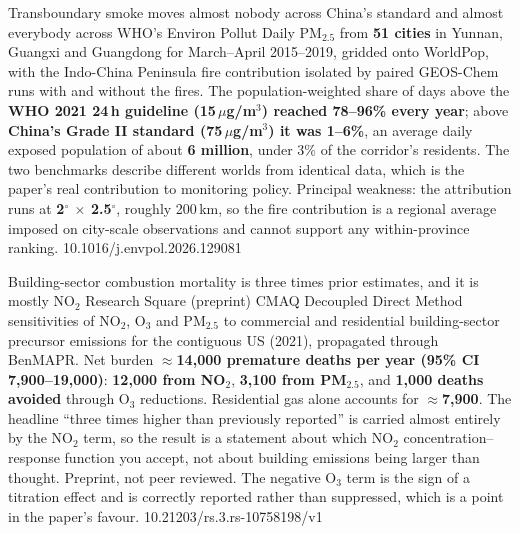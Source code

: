 \documentclass[10pt]{article}
\begin{document}
{Transboundary smoke moves almost nobody across China's standard and almost everybody
across WHO's}
{Environ Pollut}
{Daily PM$_{2.5}$ from \textbf{51 cities} in Yunnan, Guangxi and Guangdong for
March--April 2015--2019, gridded onto WorldPop, with the Indo-China Peninsula fire
contribution isolated by paired GEOS-Chem runs with and without the fires. The
population-weighted share of days above the \textbf{WHO 2021 24\,h guideline
(15\,$\mu$g/m$^3$) reached 78--96\% every year}; above \textbf{China's Grade II standard
(75\,$\mu$g/m$^3$) it was 1--6\%}, an average daily exposed population of about
\textbf{6 million}, under 3\% of the corridor's residents. The two benchmarks describe
different worlds from identical data, which is the paper's real contribution to monitoring
policy. Principal weakness: the attribution runs at \textbf{2$^\circ$ $\times$
2.5$^\circ$}, roughly 200\,km, so the fire contribution is a regional average imposed on
city-scale observations and cannot support any within-province ranking.}
{10.1016/j.envpol.2026.129081}

{Building-sector combustion mortality is three times prior estimates, and it is mostly NO$_2$}
{Research Square (preprint)}
{CMAQ Decoupled Direct Method sensitivities of NO$_2$, O$_3$ and PM$_{2.5}$ to
commercial and residential building-sector precursor emissions for the contiguous US
(2021), propagated through BenMAPR. Net burden \textbf{$\approx$14{,}000 premature deaths
per year (95\% CI 7{,}900--19{,}000)}: \textbf{12{,}000 from NO$_2$}, \textbf{3{,}100 from
PM$_{2.5}$}, and \textbf{1{,}000 deaths avoided} through O$_3$ reductions. Residential gas
alone accounts for \textbf{$\approx$7{,}900}. The headline ``three times higher than
previously reported'' is carried almost entirely by the NO$_2$ term, so the result is a
statement about which NO$_2$ concentration--response function you accept, not about
building emissions being larger than thought. Preprint, not peer reviewed. The negative
O$_3$ term is the sign of a titration effect and is correctly reported rather than
suppressed, which is a point in the paper's favour.}
{10.21203/rs.3.rs-10758198/v1}
\end{document}
